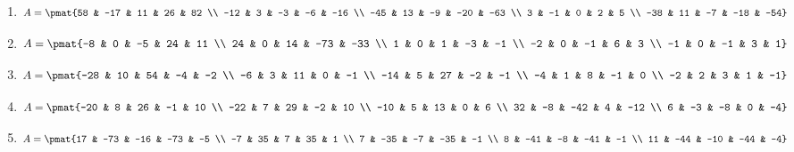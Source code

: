 \begin{enumerate}
\item

\begin{align*}
A = \pmat{58 & -17 & 11 & 26 & 82 \\ -12 & 3 & -3 & -6 & -16 \\ -45 & 13 & -9 & -20 & -63 \\ 3 & -1 & 0 & 2 & 5 \\ -38 & 11 & -7 & -18 & -54}
\end{align*}

\item

\begin{align*}
A = \pmat{-8 & 0 & -5 & 24 & 11 \\ 24 & 0 & 14 & -73 & -33 \\ 1 & 0 & 1 & -3 & -1 \\ -2 & 0 & -1 & 6 & 3 \\ -1 & 0 & -1 & 3 & 1}
\end{align*}

\item

\begin{align*}
A = \pmat{-28 & 10 & 54 & -4 & -2 \\ -6 & 3 & 11 & 0 & -1 \\ -14 & 5 & 27 & -2 & -1 \\ -4 & 1 & 8 & -1 & 0 \\ -2 & 2 & 3 & 1 & -1}
\end{align*}

\item

\begin{align*}
A = \pmat{-20 & 8 & 26 & -1 & 10 \\ -22 & 7 & 29 & -2 & 10 \\ -10 & 5 & 13 & 0 & 6 \\ 32 & -8 & -42 & 4 & -12 \\ 6 & -3 & -8 & 0 & -4}
\end{align*}

\item

\begin{align*}
A = \pmat{17 & -73 & -16 & -73 & -5 \\ -7 & 35 & 7 & 35 & 1 \\ 7 & -35 & -7 & -35 & -1 \\ 8 & -41 & -8 & -41 & -1 \\ 11 & -44 & -10 & -44 & -4}
\end{align*}


\end{enumerate}
